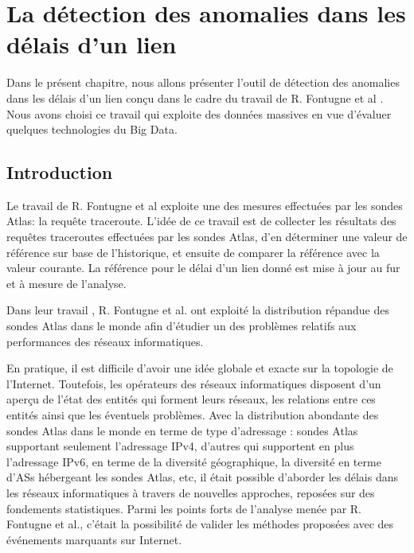 
\chapter{La détection des anomalies dans les délais d'un lien}



Dans le présent chapitre, nous allons présenter l'outil de détection des anomalies dans les délais d'un lien  conçu dans le cadre du travail de R. Fontugne et al \cite{DBLP:journals/corr/FontugneAPB16}. Nous avons choisi ce travail qui exploite des données massives en vue d'évaluer quelques technologies du Big Data.

\section{Introduction}
Le travail de R. Fontugne \cite{DBLP:journals/corr/FontugneAPB16} et al exploite une des mesures effectuées par les sondes Atlas: la requête traceroute. L'idée de ce travail est de collecter les résultats des requêtes traceroutes effectuées par les sondes Atlas, d'en déterminer une valeur de référence sur base de l'historique, et ensuite de comparer la référence avec la valeur courante. La référence pour le délai  d'un lien donné   est mise à jour au fur et à mesure de l'analyse.



Dans leur travail \cite{DBLP:journals/corr/FontugneAPB16},  R. Fontugne et al. ont exploité la  distribution répandue des sondes Atlas dans le monde afin d'étudier un des problèmes relatifs aux performances des réseaux informatiques. 

En pratique, il est  difficile  d'avoir une idée globale et exacte sur la topologie de l'Internet. Toutefois, les opérateurs des réseaux informatiques  disposent d'un aperçu de l'état des entités qui forment leurs réseaux, les relations entre ces entités ainsi que les éventuels problèmes. Avec la distribution abondante des sondes Atlas dans le monde en terme de type d'adressage : sondes Atlas supportant seulement l'adressage IPv4, d'autres qui supportent en plus l'adressage IPv6, en terme de  la diversité géographique, la diversité en terme d'ASs hébergeant les sondes Atlas, etc, il était  possible d'aborder  les délais dans les réseaux informatiques à travers de nouvelles approches, reposées sur des fondements statistiques. Parmi les points forts de l'analyse menée par R. Fontugne et al., c'était la possibilité de valider les   méthodes proposées avec des événements  marquants sur Internet.

